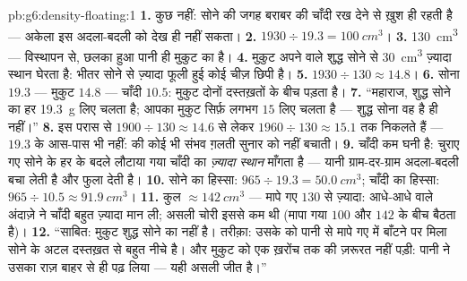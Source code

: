 \begin{solution}{pb:g6:density-floating:1}
\textbf{1.} कुछ नहीं: सोने की जगह बराबर \emph{} की चाँदी रख
देने से  ख़ुश ही रहती है --- अकेला  इस अदला-बदली को देख
ही नहीं सकता।
\textbf{2.} $1930 \div 19.3 = \qty{100}{cm^3}$।
\textbf{3.} \qty{130}{cm^3} --- विस्थापन से, छलका हुआ पानी ही मुकुट
का  है।
\textbf{4.} मुकुट अपने  वाले शुद्ध सोने से \qty{30}{cm^3}
ज़्यादा स्थान घेरता है: भीतर सोने से ज़्यादा फूली हुई कोई चीज़ छिपी
है।
\textbf{5.} $1930 \div 130 \approx 14.8$।
\textbf{6.} सोना $19.3$ --- मुकुट $14.8$ --- चाँदी $10.5$: मुकुट
दोनों दस्तख़तों के बीच पड़ता है।
\textbf{7.} ``महाराज, शुद्ध सोने का हर  \qty{19.3}{g}
लिए चलता है; आपका मुकुट सिर्फ़ लगभग $15$ लिए चलता है --- शुद्ध सोना
वह है ही नहीं।''
\textbf{8.} इस परास से  $1900 \div 130 \approx 14.6$ से लेकर
$1960 \div 130 \approx 15.1$ तक निकलते हैं --- $19.3$ के आस-पास भी
नहीं:  की कोई भी संभव ग़लती सुनार को नहीं बचाती।
\textbf{9.} चाँदी कम घनी है: चुराए गए सोने के हर  के बदले लौटाया
गया चाँदी का  \emph{ज़्यादा स्थान} माँगता है --- यानी
ग्राम-दर-ग्राम अदला-बदली  बचा लेती है और  फुला देती है।
\textbf{10.} सोने का हिस्सा: $965 \div 19.3 = \qty{50.0}{cm^3}$;
चाँदी का हिस्सा: $965 \div 10.5 \approx \qty{91.9}{cm^3}$।
\textbf{11.} कुल $\approx \qty{142}{cm^3}$ --- मापे गए $130$ से
ज़्यादा: आधे-आधे वाले अंदाज़े ने चाँदी बहुत ज़्यादा मान ली; असली चोरी
इससे कम थी (मापा गया  $100$ और $142$ के बीच बैठता है)।
\textbf{12.} ``साबित: मुकुट शुद्ध सोने का नहीं है। तरीक़ा: उसके
 को पानी से मापे गए  में बाँटने पर मिला  सोने के अटल
दस्तख़त से बहुत नीचे है। और मुकुट को एक ख़रोंच तक की ज़रूरत नहीं पड़ी:
पानी ने उसका राज़ बाहर से ही पढ़ लिया --- यही असली जीत है।''
\end{solution}
